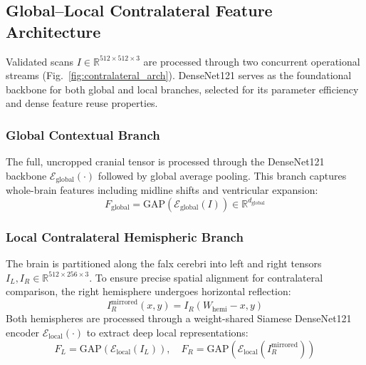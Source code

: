 \documentclass[conference]{IEEEtran}
\begin{document}
\subsection{Global--Local Contralateral Feature Architecture}
Validated scans $I \in \mathbb{R}^{512 \times 512 \times 3}$ are processed through two concurrent operational streams (Fig.~\ref{fig:contralateral_arch}). DenseNet121 \cite{b10} serves as the foundational backbone for both global and local branches, selected for its parameter efficiency and dense feature reuse properties.

\subsubsection{Global Contextual Branch}
The full, uncropped cranial tensor is processed through the DenseNet121 backbone $\mathcal{E}_{\text{global}}(\cdot)$ followed by global average pooling. This branch captures whole-brain features including midline shifts and ventricular expansion:
\begin{equation}
F_{\text{global}} = \text{GAP}(\mathcal{E}_{\text{global}}(I)) \in \mathbb{R}^{d_{\text{global}}}
\end{equation}

\subsubsection{Local Contralateral Hemispheric Branch}
The brain is partitioned along the falx cerebri into left and right tensors $I_L, I_R \in \mathbb{R}^{512 \times 256 \times 3}$. To ensure precise spatial alignment for contralateral comparison, the right hemisphere undergoes horizontal reflection:
\begin{equation}
I_R^{\text{mirrored}}(x, y) = I_R(W_{\text{hemi}} - x, y)
\end{equation}
Both hemispheres are processed through a weight-shared Siamese DenseNet121 encoder $\mathcal{E}_{\text{local}}(\cdot)$ to extract deep local representations:
\begin{equation}
F_L = \text{GAP}(\mathcal{E}_{\text{local}}(I_L)), \quad F_R = \text{GAP}(\mathcal{E}_{\text{local}}(I_R^{\text{mirrored}}))
\end{equation}
\end{document}
